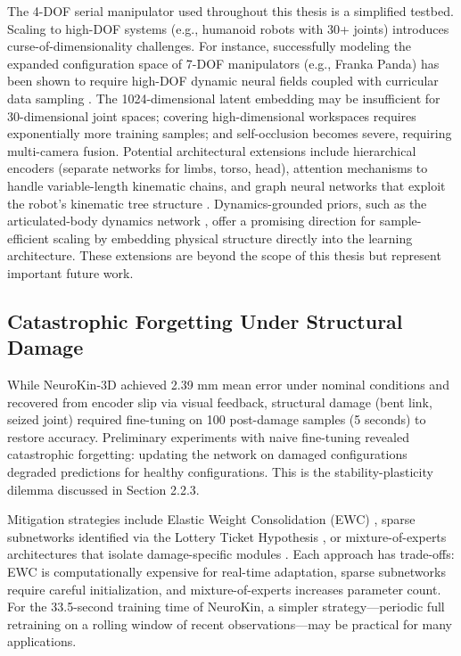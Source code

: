 \documentclass[12pt,a4paper,oneside]{report}
\begin{document}
The 4-DOF serial manipulator used throughout this thesis is a simplified testbed. Scaling to high-DOF systems (e.g., humanoid robots with 30+ joints) introduces curse-of-dimensionality challenges. For instance, successfully modeling the expanded configuration space of 7-DOF manipulators (e.g., Franka Panda) has been shown to require high-DOF dynamic neural fields coupled with curricular data sampling \cite{schulze2024high}. The 1024-dimensional latent embedding may be insufficient for 30-dimensional joint spaces; covering high-dimensional workspaces requires exponentially more training samples; and self-occlusion becomes severe, requiring multi-camera fusion. Potential architectural extensions include hierarchical encoders (separate networks for limbs, torso, head), attention mechanisms to handle variable-length kinematic chains, and graph neural networks that exploit the robot's kinematic tree structure \cite{patel2024getzero}. Dynamics-grounded priors, such as the articulated-body dynamics network \cite{rajeswaran2025embodiedynamics}, offer a promising direction for sample-efficient scaling by embedding physical structure directly into the learning architecture. These extensions are beyond the scope of this thesis but represent important future work.

\subsection{Catastrophic Forgetting Under Structural Damage}

While NeuroKin-3D achieved 2.39 mm mean error under nominal conditions and recovered from encoder slip via visual feedback, structural damage (bent link, seized joint) required fine-tuning on 100 post-damage samples (5 seconds) to restore accuracy. Preliminary experiments with naive fine-tuning revealed catastrophic forgetting: updating the network on damaged configurations degraded predictions for healthy configurations. This is the stability-plasticity dilemma discussed in Section 2.2.3.

Mitigation strategies include Elastic Weight Consolidation (EWC) \cite{kirkpatrick2017overcoming}, sparse subnetworks identified via the Lottery Ticket Hypothesis \cite{frankle2018lottery}, or mixture-of-experts architectures that isolate damage-specific modules \cite{mocanu2018scalable}. Each approach has trade-offs: EWC is computationally expensive for real-time adaptation, sparse subnetworks require careful initialization, and mixture-of-experts increases parameter count. For the 33.5-second training time of NeuroKin, a simpler strategy---periodic full retraining on a rolling window of recent observations---may be practical for many applications.
\end{document}
